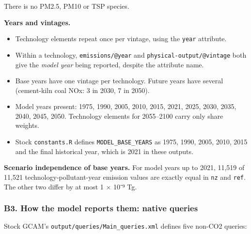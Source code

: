 There is
no PM2.5,
PM10 or
TSP
species.

\textbf{Years
and
vintages.}

\begin{itemize}
\tightlist
\item
  Technology
  elements
  repeat
  once per
  vintage,
  using
  the
  \texttt{year}
  attribute.
\item
  Within a
  technology,
  \texttt{emissions/\allowbreak{}@year}
  and
  \texttt{physical-\allowbreak{}output/\allowbreak{}@vintage}
  both
  give the
  \emph{model
  year}
  being
  reported,
  despite
  the
  attribute
  name.
\item
  Base
  years
  have one
  vintage
  per
  technology.
  Future
  years
  have
  several
  (cement-kiln
  coal
  NOx: 3
  in 2030,
  7 in
  2050).
\item
  Model
  years
  present:
  1975,
  1990,
  2005,
  2010,
  2015,
  2021,
  2025,
  2030,
  2035,
  2040,
  2045,
  2050.
  Technology
  elements
  for
  2055--2100
  carry
  only
  share
  weights.
\item
  Stock
  \texttt{constants.\allowbreak{}R}
  defines
  \texttt{MODEL\_\allowbreak{}BASE\_\allowbreak{}YEARS}
  as 1975,
  1990,
  2005,
  2010,
  2015 and
  the
  final
  historical
  year,
  which is
  2021 in
  these
  outputs.
\end{itemize}

\textbf{Scenario
independence
of base
years.}
For model
years up
to 2021,
11,519 of
11,521
technology-pollutant-year
emission
values are
exactly
equal in
\texttt{nz}
and
\texttt{ref}.
The other
two differ
by at most
1 × 10⁻⁹
Tg.

\hypertarget{b3.-how-the-model-reports-them-native-queries}{%
\subsubsection{B3.
How the
model
reports
them:
native
queries}\label{b3.-how-the-model-reports-them-native-queries}}

Stock
GCAM's
\texttt{output/\allowbreak{}queries/\allowbreak{}Main\_\allowbreak{}queries.\allowbreak{}xml}
defines
five
non-CO2
queries:

